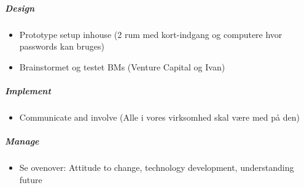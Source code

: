 \subparagraph{Design}
\begin{itemize}
\item Prototype setup inhouse (2 rum med kort-indgang og computere hvor passwords kan bruges)
\item Brainstormet og testet BMs (Venture Capital og Ivan)
\end{itemize}

\subparagraph{Implement}
\begin{itemize}
  \item Communicate and involve (Alle i vores virksomhed skal være med på den)
\end{itemize}

\subparagraph{Manage}
\begin{itemize}
  \item Se ovenover: Attitude to change, technology development, understanding future
\end{itemize}

